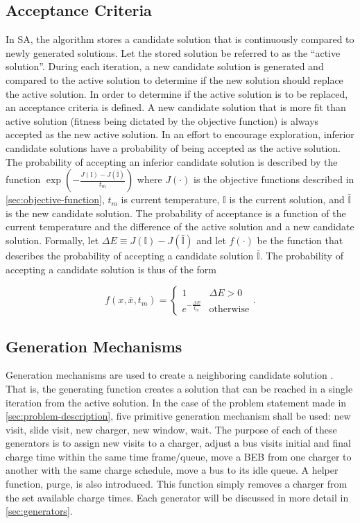 \documentclass[11pt,a4paper,final]{article}
\newcommand{\I}{\mathbb{I}}                 %
\begin{document}
\subsection{Acceptance Criteria}
\label{sec:acceptance}
In SA, the algorithm stores a candidate solution that is continuously compared to newly generated solutions. Let the
stored solution be referred to as the ``active solution''. During each iteration, a new candidate solution is generated
and compared to the active solution to determine if the new solution should replace the active solution. In order to
determine if the active solution is to be replaced, an acceptance criteria is defined. A new candidate solution that is
more fit than active solution (fitness being dictated by the objective function) is always accepted as the new active
solution. In an effort to encourage exploration, inferior candidate solutions have a probability of being accepted as
the active solution. The probability of accepting an inferior candidate solution is described by the function
\(\exp(-\frac{J(\I) - J(\bar{\I})}{t_m})\) where \(J(\cdot)\) is the objective functions described in \ref{sec:objective-function},
\(t_m\) is current temperature, \(\I\) is the current solution, and \(\bar{\I}\) is the new candidate solution. The
probability of acceptance is a function of the current temperature and the difference of the active solution and a new
candidate solution. Formally, let \(\Delta E \equiv J(\I) - J(\bar{\I})\) and let \(f(\cdot)\) be the function that describes the
probability of accepting a candidate solution \(\bar{\I}\). The probability of accepting a candidate solution is thus of
the form \cite{keller-2019-multi-objec}

\begin{equation}
\label{eq:candaccept}
f(x,\bar{x},t_m) =
\begin{cases}
  1                   & \Delta E > 0 \\
  e^{- \frac{\Delta E}{t_m}} & \text{otherwise}
\end{cases}\text{.}
\end{equation}

\subsection{Generation Mechanisms}
\label{sec:generation-mechanisms}
Generation mechanisms are used to create a neighboring candidate solution \cite{gendreau-2018-handb-metah}. That is,
the generating function creates a solution that can be reached in a single iteration from the active solution. In the
case of the problem statement made in \ref{sec:problem-description}, five primitive generation mechanism shall be used: new
visit, slide visit, new charger, new window, wait. The purpose of each of these generators is to assign new visits to a
charger, adjust a bus visits initial and final charge time within the same time frame/queue, move a BEB from one charger
to another with the same charge schedule, move a bus to its idle queue. A helper function, purge, is also introduced.
This function simply removes a charger from the set available charge times. Each generator will be discussed in more
detail in \ref{sec:generators}.
\end{document}
